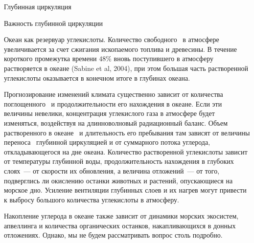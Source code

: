 \begin{chapter}{Глубинная циркуляция}
\begin{section}{Важность глубинной циркуляции}
\begin{paragraph}{Океан как резервуар углекислоты.}
Количество свободного~\COtwo{} в атмосфере увеличивается за счет
сжигания ископаемого топлива и древесины. В течение короткого промежутка
времени $48\%$ вновь поступившего в атмосферу~\COtwo{} растворяется в 
океане (Sabine et al, 2004), при этом большая часть растворенной углекислоты
оказывается в конечном итоге в глубинах океана.
%

Прогнозирование изменений климата существенно зависит от количества
поглощенного~\COtwo{} и продолжительности его нахождения в океане. Если эти
величины невелики, концентрация углекислого газа в атмосфере будет изменяться, 
воздействуя на длинноволновый радиационный баланс. Объем растворенного в 
океане~\COtwo{} и длительность его пребывания там зависят от величины
переноса~\COtwo{} глубинной циркуляцией и от
суммарного потока углерода, откладывающегося на дне океана. 
Количество растворенной углекислоты зависит от температуры глубинной воды,
продолжительность нахождения в глубоких слоях~--- от скорости их обновления,
а величина отложений~--- от того, подверглись ли окислению останки животных 
и растений, опускающиеся на морское дно. Усиление вентиляции глубинных слоев 
и их нагрев могут привести к выбросу большого количества углекислоты 
в атмосферу.
%

Накопление углерода в океане также зависит от динамики морских экосистем,
апвеллинга и количества органических 
останков, накапливающихся в донных отложениях. Однако, мы не будем 
рассматривать вопрос столь подробно.
%
\end{paragraph}


\end{section}
\end{chapter}
